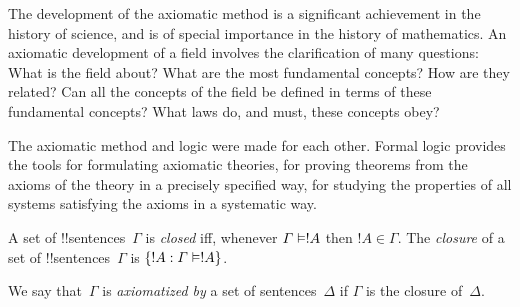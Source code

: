 \documentclass[../../../include/open-logic-section]{subfiles}
\begin{document}

\begin{explain}
The development of the axiomatic method is a significant achievement
in the history of science, and is of special importance in the history
of mathematics.  An axiomatic development of a field involves the
clarification of many questions: What is the field about?  What are the
most fundamental concepts?  How are they related?  Can all the
concepts of the field be defined in terms of these fundamental
concepts?  What laws do, and must, these concepts obey?

The axiomatic method and logic were made for each other.  Formal logic
provides the tools for formulating axiomatic theories, for proving
theorems from the axioms of the theory in a precisely specified way,
for studying the properties of all systems satisfying the axioms in a
systematic way.
\end{explain}

\begin{defn}
A set of !!{sentence}s~$\Gamma$ is \emph{closed} iff, whenever
$\Gamma \Entails !A$ then $!A \in \Gamma$.  The \emph{closure} of a set
of !!{sentence}s~$\Gamma$ is $\Setabs{!A}{\Gamma \Entails !A}$.

We say that~$\Gamma$ is \emph{axiomatized by} a set of
sentences~$\Delta$ if $\Gamma$ is the closure of~$\Delta.$
\end{defn}
\end{document}
